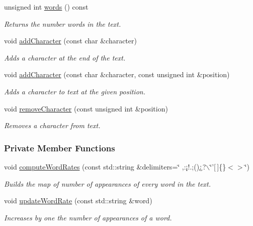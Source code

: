 \begin{CompactItemize}
unsigned int \hyperlink{class_text_edfd71af7802a2d72eed7365f081a66d}{words} () const 
\begin{CompactList}\small\item\em Returns the number words in the text. \item\end{CompactList}\item 
void \hyperlink{class_text_6e6da63c90af68639adc7dd1336f6bf9}{addCharacter} (const char \&character)
\begin{CompactList}\small\item\em Adds a character at the end of the text. \item\end{CompactList}\item 
void \hyperlink{class_text_fdd11ad0c90ca483d4cff3d74a64da9e}{addCharacter} (const char \&character, const unsigned int \&position)
\begin{CompactList}\small\item\em Adds a character to text at the given position. \item\end{CompactList}\item 
void \hyperlink{class_text_e04500eeada2a4a3bb00554b32263c52}{removeCharacter} (const unsigned int \&position)
\begin{CompactList}\small\item\em Removes a character from text. \item\end{CompactList}\end{CompactItemize}
\subsubsection*{Private Member Functions}
\begin{CompactItemize}
\item 
void \hyperlink{class_text_e954a35628c72537e2ee5ca6e9609ac1}{computeWordRates} (const std::string \&delimiters=\char`\"{} ,:¡!.;()¿?$\backslash$\char`\"{}'\mbox{[}$\,$\mbox{]}\{\}$<$$>$\char`\"{})
\begin{CompactList}\small\item\em Builds the map of number of appearances of every word in the text. \item\end{CompactList}\item 
void \hyperlink{class_text_5ab8f9bfa566de537a167991fe10eff5}{updateWordRate} (const std::string \&word)
\begin{CompactList}\small\item\em Increases by one the number of appearances of a word. \item\end{CompactList}\end{CompactItemize}
